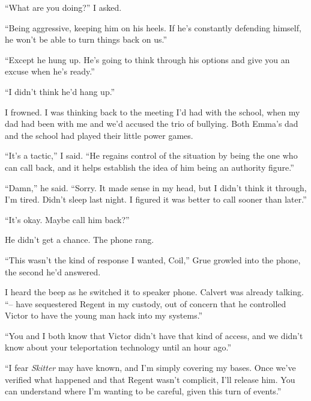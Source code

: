 ``What are you doing?'' I asked.



``Being aggressive, keeping him on his heels.  If he's constantly defending himself, he won't be able to turn things back on us.''



``Except he hung up.  He's going to think through his options and give you an excuse when he's ready.''



``I didn't think he'd hang up.''



I frowned.  I was thinking back to the meeting I'd had with the school, when my dad had been with me and we'd accused the trio of bullying.  Both Emma's dad and the school had played their little power games.



``It's a tactic,'' I said.  ``He regains control of the situation by being the one who can call back, and it helps establish the idea of him being an authority figure.''



``Damn,'' he said.  ``Sorry.  It made sense in my head, but I didn't think it through, I'm tired.  Didn't sleep last night.  I figured it was better to call sooner than later.''



``It's okay.  Maybe call him back?''



He didn't get a chance.  The phone rang.



``This wasn't the kind of response I wanted, Coil,'' Grue growled into the phone, the second he'd answered.



I heard the beep as he switched it to speaker phone.  Calvert was already talking.  ``-- have sequestered Regent in my custody, out of concern that he controlled Victor to have the young man hack into my systems.''



``You and I both know that Victor didn't have that kind of access, and we didn't know about your teleportation technology until an hour ago.''



``I fear \emph{Skitter} may have known, and I'm simply covering my bases.  Once we've verified what happened and that Regent wasn't complicit, I'll release him.  You can understand where I'm wanting to be careful, given this turn of events.''



